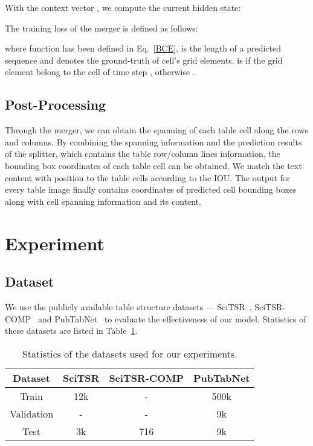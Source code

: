 \documentclass[review]{elsarticle}
\begin{document}
With the context vector , we compute the current hidden state:


The training loss of the merger is defined as follows:

where function  has been defined in Eq.~\ref{BCE},  is the length of a predicted sequence and  denotes the ground-truth of cell's grid elements.  is  if the  grid element belong to the cell of time step , otherwise .

\subsection{Post-Processing}
	Through the merger, we can obtain the spanning of each table cell along the rows and columns. By combining the spanning information and the prediction results of the splitter, which contains the table row/column lines information, the bounding box coordinates of each table cell can be obtained. We match the text content with position to the table cells according to the IOU. The output for every table image finally contains coordinates of predicted cell bounding boxes along with cell spanning information and its content.

\section{Experiment}
\subsection{Dataset}
We use the publicly available table structure datasets — SciTSR~\cite{GraphTSR}, SciTSR-COMP~\cite{GraphTSR} and PubTabNet~\cite{EDD} to evaluate the effectiveness of our model. Statistics of these datasets are listed in Table~\ref{datasets}.

\begin{table}[!htp]
	\centering
	\renewcommand\arraystretch{1.2}
	\setlength{\tabcolsep}{6mm}
	
	\caption{Statistics of the datasets used for our experiments.}
	\label{datasets}
	\begin{tabular}{c|ccc}
		\hline
		Dataset 	& SciTSR & SciTSR-COMP & PubTabNet \\ \hline
		Train   	& 12k    & -   & 500k \\
		Validation  & -      & -   & 9k   \\
		Test    	& 3k     & 716 & 9k   \\ \hline
	\end{tabular}
\end{table}
\end{document}
